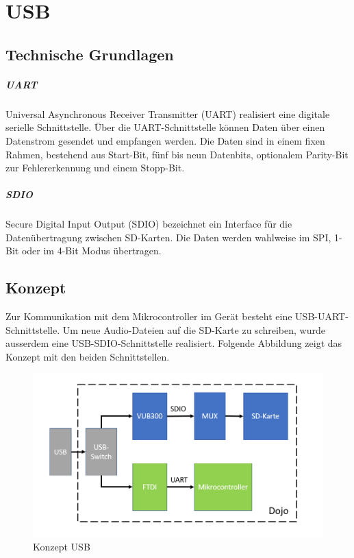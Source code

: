 \chapter{USB}
\label{USB}
\thispagestyle{fancy}  
\section{Technische Grundlagen}

\paragraph{UART}
Universal Asynchronous Receiver Transmitter (UART) realisiert eine digitale serielle Schnittstelle. Über die UART-Schnittstelle können Daten über einen Datenstrom gesendet und empfangen werden. Die Daten sind in einem fixen Rahmen, bestehend aus Start-Bit, fünf bis neun Datenbits, optionalem Parity-Bit zur Fehlererkennung und einem Stopp-Bit.

\paragraph{SDIO}
Secure Digital Input Output (SDIO) bezeichnet ein Interface für die Datenübertragung zwischen SD-Karten. Die Daten werden wahlweise im SPI, 1-Bit oder im 4-Bit Modus übertragen.

\section{Konzept}

Zur Kommunikation mit dem Mikrocontroller im Gerät besteht eine USB-UART-Schnittstelle. Um neue Audio-Dateien auf die SD-Karte zu schreiben, wurde ausserdem eine USB-SDIO-Schnittstelle realisiert. Folgende Abbildung zeigt das Konzept mit den beiden Schnittstellen.

\begin{figure}[h]
	\centering
	\includegraphics[width=\textwidth]{Bilder/Konzept_USB.PNG}
	\caption{Konzept USB}
	\label{Konzept_USB}
\end{figure}

